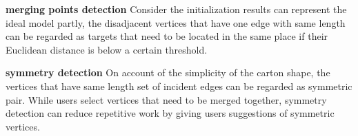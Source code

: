 \noindent
\textbf{merging points detection} Consider the initialization results can represent the ideal model partly, the disadjacent vertices that have one edge with same length can be regarded as targets that need to be located in the same place if their Euclidean distance is below a certain threshold.

\noindent
\textbf{symmetry detection} On account of the simplicity of the carton shape, the vertices that have same length set of incident edges can be regarded as symmetric pair. While users select vertices that need to be merged together, symmetry detection can reduce repetitive work by giving users suggestions of symmetric vertices.